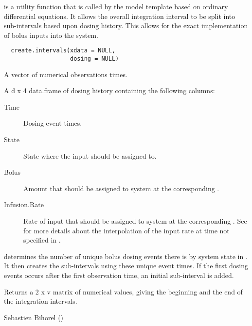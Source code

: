 %
\begin{Description}\relax
{} is a utility function that is called by the model
template based on ordinary differential equations. It allows the overall
integration interval to be split into sub-intervals based upon dosing history.
This allows for the exact implementation of bolus inputs into the system.
\end{Description}
%
\begin{Usage}
\begin{verbatim}
  create.intervals(xdata = NULL,
                   dosing = NULL)
\end{verbatim}
\end{Usage}
%
\begin{Arguments}
\begin{ldescription}
\item[\code{xdata}] A vector of numerical observations times.
\item[\code{dosing}] A d x 4 data.frame of dosing history containing the following 
columns: \begin{description}

\item[Time] Dosing event times.
\item[State] State where the input should be assigned to.
\item[Bolus] Amount that should be assigned to system  at the
corresponding .
\item[Infusion.Rate] Rate of input that should be assigned to system
 at the corresponding . See
 for more details about
the interpolation of the input rate at time not specified in
.

\end{description}


\end{ldescription}
\end{Arguments}
%
\begin{Details}\relax
{} determines the number of unique bolus dosing events
there is by system state in . It then creates the sub-intervals
using these unique event times. If the first dosing events occurs after the
first observation time, an initial sub-interval is added. 
\end{Details}
%
\begin{Value}
Returns a 2 x v matrix of numerical values, giving the beginning and the end
of the integration intervals.
\end{Value}
%
\begin{Author}\relax
Sebastien Bihorel ()
\end{Author}
